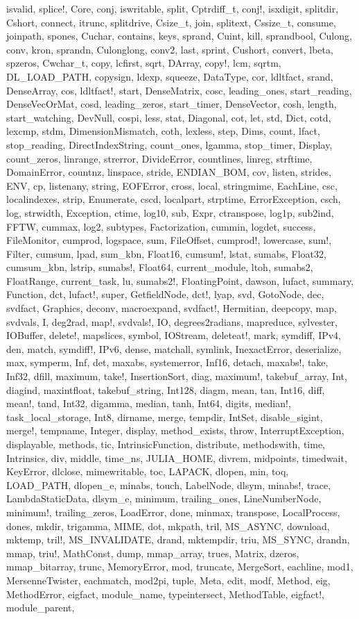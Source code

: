 isvalid, splice!, Core, conj, iswritable, split, Cptrdiff_t, conj!, isxdigit, splitdir, Cshort, connect, itrunc, splitdrive, Csize_t, join, splitext, Cssize_t, consume, joinpath, spones, Cuchar, contains, keys, sprand, Cuint, kill, sprandbool, Culong, conv, kron, sprandn, Culonglong, conv2, last, sprint, Cushort, convert, lbeta, spzeros, Cwchar_t, copy, lcfirst, sqrt, DArray, copy!, lcm, sqrtm, DL_LOAD_PATH, copysign, ldexp, squeeze, DataType, cor, ldltfact, srand, DenseArray, cos, ldltfact!, start, DenseMatrix, cosc, leading_ones, start_reading, DenseVecOrMat, cosd, leading_zeros, start_timer, DenseVector, cosh, length, start_watching, DevNull, cospi, less, stat, Diagonal, cot, let, std, Dict, cotd, lexcmp, stdm, DimensionMismatch, coth, lexless, step, Dims, count, lfact, stop_reading, DirectIndexString, count_ones, lgamma, stop_timer, Display, count_zeros, linrange, strerror, DivideError, countlines, linreg, strftime, DomainError, countnz, linspace, stride, ENDIAN_BOM, cov, listen, strides, ENV, cp, listenany, string, EOFError, cross, local, stringmime, EachLine, csc, localindexes, strip, Enumerate, cscd, localpart, strptime, ErrorException, csch, log, strwidth, Exception, ctime, log10, sub, Expr, ctranspose, log1p, sub2ind, FFTW, cummax, log2, subtypes, Factorization, cummin, logdet, success, FileMonitor, cumprod, logspace, sum, FileOffset, cumprod!, lowercase, sum!, Filter, cumsum, lpad, sum_kbn, Float16, cumsum!, lstat, sumabs, Float32, cumsum_kbn, lstrip, sumabs!, Float64, current_module, ltoh, sumabs2, FloatRange, current_task, lu, sumabs2!, FloatingPoint, dawson, lufact, summary, Function, dct, lufact!, super, GetfieldNode, dct!, lyap, svd, GotoNode, dec, svdfact, Graphics, deconv, macroexpand, svdfact!, Hermitian, deepcopy, map, svdvals, I, deg2rad, map!, svdvals!, IO, degrees2radians, mapreduce, sylvester, IOBuffer, delete!, mapslices, symbol, IOStream, deleteat!, mark, symdiff, IPv4, den, match, symdiff!, IPv6, dense, matchall, symlink, InexactError, deserialize, max, symperm, Inf, det, maxabs, systemerror, Inf16, detach, maxabs!, take, Inf32, dfill, maximum, take!, InsertionSort, diag, maximum!, takebuf_array, Int, diagind, maxintfloat, takebuf_string, Int128, diagm, mean, tan, Int16, diff, mean!, tand, Int32, digamma, median, tanh, Int64, digits, median!, task_local_storage, Int8, dirname, merge, tempdir, IntSet, disable_sigint, merge!, tempname, Integer, display, method_exists, throw, InterruptException, displayable, methods, tic, IntrinsicFunction, distribute, methodswith, time, Intrinsics, div, middle, time_ns, JULIA_HOME, divrem, midpoints, timedwait, KeyError, dlclose, mimewritable, toc, LAPACK, dlopen, min, toq, LOAD_PATH, dlopen_e, minabs, touch, LabelNode, dlsym, minabs!, trace, LambdaStaticData, dlsym_e, minimum, trailing_ones, LineNumberNode, minimum!, trailing_zeros, LoadError, done, minmax, transpose, LocalProcess, dones, mkdir, trigamma, MIME, dot, mkpath, tril, MS_ASYNC, download, mktemp, tril!, MS_INVALIDATE, drand, mktempdir, triu, MS_SYNC, drandn, mmap, triu!, MathConst, dump, mmap_array, trues, Matrix, dzeros, mmap_bitarray, trunc, MemoryError, mod, truncate, MergeSort, eachline, mod1, MersenneTwister, eachmatch, mod2pi, tuple, Meta, edit, modf, Method, eig, MethodError, eigfact, module_name, typeintersect, MethodTable, eigfact!, module_parent, 
